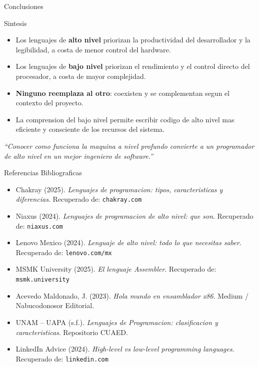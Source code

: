 \documentclass[10pt, aspectratio=169]{beamer}
\begin{document}
	\begin{frame}{Conclusiones}
		\begin{block}{Sintesis}
			\begin{itemize}
				\item Los lenguajes de \textbf{alto nivel} priorizan la productividad del
				desarrollador y la legibilidad, a costa de menor control del hardware.
				\item Los lenguajes de \textbf{bajo nivel} priorizan el rendimiento y el control
				directo del procesador, a costa de mayor complejidad.
				\item \textbf{Ninguno reemplaza al otro}: coexisten y se complementan segun
				el contexto del proyecto.
				\item La comprension del bajo nivel permite escribir codigo de alto nivel mas
				eficiente y consciente de los recursos del sistema.
			\end{itemize}
		\end{block}
		\vspace{0.3cm}
		\centering
		\textit{``Conocer como funciona la maquina a nivel profundo convierte a un
			programador de alto nivel en un mejor ingeniero de software.''}
	\end{frame}
	
	\begin{frame}{Referencias Bibliograficas}
		\small
		\begin{itemize}
			\item Chakray (2025). \textit{Lenguajes de programacion: tipos, caracteristicas y
				diferencias}. Recuperado de: \texttt{chakray.com}
			\item Niaxus (2024). \textit{Lenguajes de programacion de alto nivel: que son}.
			Recuperado de: \texttt{niaxus.com}
			\item Lenovo Mexico (2024). \textit{Lenguaje de alto nivel: todo lo que necesitas
				saber}. Recuperado de: \texttt{lenovo.com/mx}
			\item MSMK University (2025). \textit{El lenguaje Assembler}.
			Recuperado de: \texttt{msmk.university}
			\item Acevedo Maldonado, J. (2023). \textit{Hola mundo en ensamblador x86}.
			Medium / Nabucodonosor Editorial.
			\item UNAM -- UAPA (s.f.). \textit{Lenguajes de Programacion: clasificacion y
				caracteristicas}. Repositorio CUAED.
			\item LinkedIn Advice (2024). \textit{High-level vs low-level programming languages}.
			Recuperado de: \texttt{linkedin.com}
		\end{itemize}
	\end{frame}
	
\end{document}
